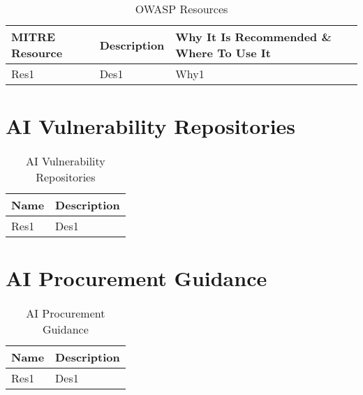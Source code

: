 \begin{table}[h]
\begin{tabularx}{\textwidth} {
  | >{\raggedright\arraybackslash}X
  | >{\raggedright\arraybackslash}X
  | >{\raggedright\arraybackslash}X | }
 \hline
  \rowcolor{owasplightpurple}
    \textbf{MITRE Resource} & \textbf{Description} & \textbf{Why It Is Recommended \& Where To Use It}   \\
    \hline
    Res1 & Des1  & Why1  \\
    \hline
\end{tabularx}
\caption{OWASP Resources}
\label{tab:mitre-resources}
\end{table}

\clearpage
\section{AI Vulnerability Repositories}

\begin{table}[h]
\begin{tabularx}{\textwidth} {
  | >{\raggedright\arraybackslash}X
  | >{\raggedright\arraybackslash}X | }
 \hline
  \rowcolor{owasplightpurple}
    \textbf{Name} & \textbf{Description}   \\
    \hline
    Res1 & Des1   \\
    \hline
\end{tabularx}
\caption{AI Vulnerability Repositories}
\label{tab:ai-vulnerability-repositories}
\end{table}

\clearpage
\section{AI Procurement Guidance}

\begin{table}[h]
\begin{tabularx}{\textwidth} {
  | >{\raggedright\arraybackslash}X
  | >{\raggedright\arraybackslash}X | }
 \hline
  \rowcolor{owasplightpurple}
    \textbf{Name} & \textbf{Description}   \\
    \hline
    Res1 & Des1   \\
    \hline
\end{tabularx}
\caption{AI Procurement Guidance}
\label{tab:ai-procurement-guidance}
\end{table}
